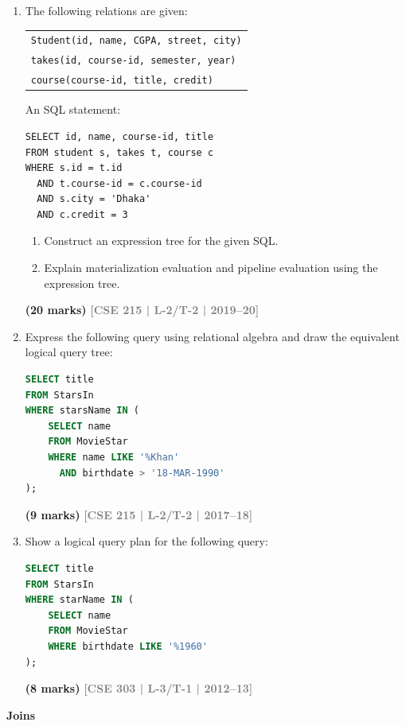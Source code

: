 \documentclass[12pt,a3paper]{article}
\newcommand{\yr}[1]{\hfill\textcolor{gray}{\small\textbf{[#1]}}}
\newcommand{\mk}[1]{\textcolor{orange!70!black}{\small\textbf{(#1 marks)}}}
\newcommand{\subtopic}[2]{%
  \vspace{10pt}
  \noindent\begin{tcolorbox}[colback=#1!8,colframe=#1,boxrule=0.6pt,arc=4pt,
    left=6pt,right=6pt,top=4pt,bottom=4pt]
    \small\bfseries\textcolor{#1}{#2}
  \end{tcolorbox}
  \vspace{2pt}
}
\begin{document}
\begin{enumerate}
\item The following relations are given:
\begin{center}
\begin{tabular}{l}
\texttt{Student(id, name, CGPA, street, city)}\\
\texttt{takes(id, course-id, semester, year)}\\
\texttt{course(course-id, title, credit)}
\end{tabular}
\end{center}
An SQL statement:
\begin{lstlisting}
SELECT id, name, course-id, title
FROM student s, takes t, course c
WHERE s.id = t.id
  AND t.course-id = c.course-id
  AND s.city = 'Dhaka'
  AND c.credit = 3
\end{lstlisting}
\begin{enumerate}
  \item Construct an expression tree for the given SQL.
  \item Explain materialization evaluation and pipeline evaluation using the expression tree.
\end{enumerate}
 \mk{20} \yr{CSE 215 | L-2/T-2 | 2019--20}

\item Express the following query using relational algebra and draw the equivalent logical query tree:
\begin{lstlisting}[language=SQL]
SELECT title
FROM StarsIn
WHERE starsName IN (
    SELECT name
    FROM MovieStar
    WHERE name LIKE '%Khan'
      AND birthdate > '18-MAR-1990'
);
\end{lstlisting}
  \mk{9} \yr{CSE 215 | L-2/T-2 | 2017--18}

\item Show a logical query plan for the following query:
\begin{lstlisting}[language=SQL]
SELECT title
FROM StarsIn
WHERE starName IN (
    SELECT name
    FROM MovieStar
    WHERE birthdate LIKE '%1960'
);
\end{lstlisting}
\mk{8} \yr{CSE 303 | L-3/T-1 | 2012--13}

\end{enumerate}

\subtopic{cD}{Joins}
\label{sub:s6-joins}
\end{document}
